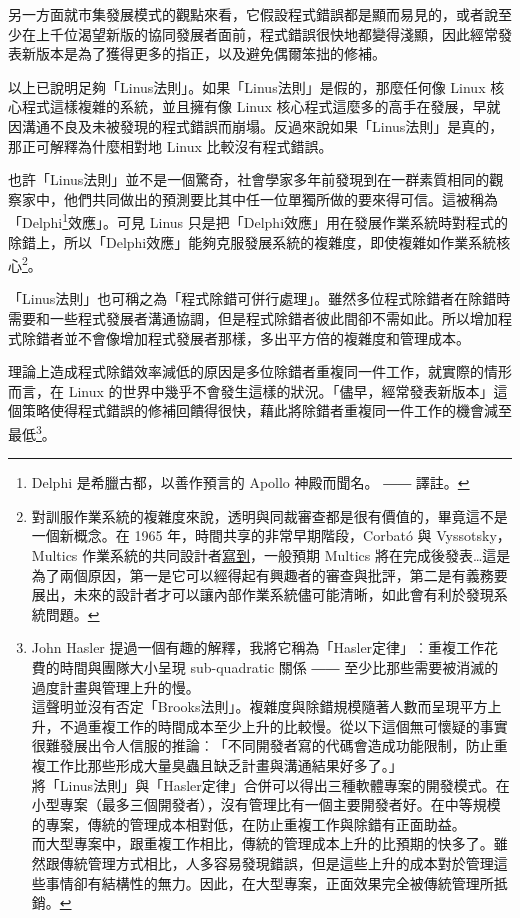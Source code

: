 \documentclass[12pt, a5paper]{book}
\begin{document}
另一方面就市集發展模式的觀點來看，它假設程式錯誤都是顯而易見的，或者說至少在上千位渴望新版的協同發展者面前，程式錯誤很快地都變得淺顯，因此經常發表新版本是為了獲得更多的指正，以及避免偶爾笨拙的修補。

以上已說明足夠「Linus法則」。如果「Linus法則」是假的，那麼任何像 Linux
核心程式這樣複雜的系統，並且擁有像 Linux
核心程式這麼多的高手在發展，早就因溝通不良及未被發現的程式錯誤而崩塌。反過來說如果「Linus法則」是真的，那正可解釋為什麼相對地
Linux 比較沒有程式錯誤。

也許「Linus法則」並不是一個驚奇，社會學家多年前發現到在一群素質相同的觀察家中，他們共同做出的預測要比其中任一位單獨所做的要來得可信。這被稱為「Delphi\footnote{Delphi
  是希臘古都，以善作預言的 Apollo 神殿而聞名。 ―― 譯註。}效應」。可見
Linus
只是把「Delphi效應」用在發展作業系統時對程式的除錯上，所以「Delphi效應」能夠克服發展系統的複雜度，即使複雜如作業系統核心\footnote{對訓服作業系統的複雜度來說，透明與同裁審查都是很有價值的，畢竟這不是一個新概念。在
  1965 年，時間共享的非常早期階段，Corbató 與 Vyssotsky，Multics
  作業系統的共同設計者\href{http://www.multicians.org/fjcc1.html}{寫到}，一般預期
  Multics
  將在完成後發表\ldots{}這是為了兩個原因，第一是它可以經得起有興趣者的審查與批評，第二是有義務要展出，未來的設計者才可以讓內部作業系統儘可能清晰，如此會有利於發現系統問題。}。

「Linus法則」也可稱之為「程式除錯可併行處理」。雖然多位程式除錯者在除錯時需要和一些程式發展者溝通協調，但是程式除錯者彼此間卻不需如此。所以增加程式除錯者並不會像增加程式發展者那樣，多出平方倍的複雜度和管理成本。

理論上造成程式除錯效率減低的原因是多位除錯者重複同一件工作，就實際的情形而言，在
Linux
的世界中幾乎不會發生這樣的狀況。「儘早，經常發表新版本」這個策略使得程式錯誤的修補回饋得很快，藉此將除錯者重複同一件工作的機會減至最低\footnote{John
  Hasler
  提過一個有趣的解釋，我將它稱為「Hasler定律」︰重複工作花費的時間與團隊大小呈現
  sub-quadratic 關係 ――
  至少比那些需要被消滅的過度計畫與管理上升的慢。\\這聲明並沒有否定「Brooks法則」。複雜度與除錯規模隨著人數而呈現平方上升，不過重複工作的時間成本至少上升的比較慢。從以下這個無可懷疑的事實很難發展出令人信服的推論︰「不同開發者寫的代碼會造成功能限制，防止重複工作比那些形成大量臭蟲且缺乏計畫與溝通結果好多了。」\\將「Linus法則」與「Hasler定律」合併可以得出三種軟體專案的開發模式。在小型專案（最多三個開發者），沒有管理比有一個主要開發者好。在中等規模的專案，傳統的管理成本相對低，在防止重複工作與除錯有正面助益。\\而大型專案中，跟重複工作相比，傳統的管理成本上升的比預期的快多了。雖然跟傳統管理方式相比，人多容易發現錯誤，但是這些上升的成本對於管理這些事情卻有結構性的無力。因此，在大型專案，正面效果完全被傳統管理所抵銷。}。
\end{document}
